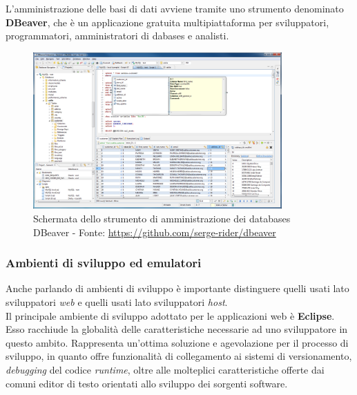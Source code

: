 	L'amministrazione delle basi di dati avviene tramite uno strumento denominato \textbf{DBeaver}, che è un applicazione gratuita multipiattaforma per sviluppatori, programmatori, amministratori di dabases e analisti.%

	\begin{figure}[H]
	\centering
	\includegraphics[width=0.85\textwidth]{immagini/DBeaver_ss}
	\caption{Schermata dello strumento di amministrazione dei databases DBeaver - Fonte: \url{https://github.com/serge-rider/dbeaver}}
	\end{figure}

	\subsubsection{Ambienti di sviluppo ed emulatori}
	\label{Ambienti di sviluppo ed emulatori}

	Anche parlando di ambienti di sviluppo è importante distinguere quelli usati lato sviluppatori \textit{web} e quelli usati lato sviluppatori \textit{host}.\\
		
	Il principale ambiente di sviluppo adottato per le applicazioni web è \textbf{Eclipse}. Esso racchiude la globalità delle caratteristiche necessarie ad uno sviluppatore in questo ambito. Rappresenta un'ottima soluzione e agevolazione per il processo di sviluppo, in quanto offre funzionalità di collegamento ai sistemi di versionamento, \textit{debugging} del codice \textit{runtime}, oltre alle molteplici caratteristiche offerte dai comuni editor di testo orientati allo sviluppo dei sorgenti software.\\
	
	

